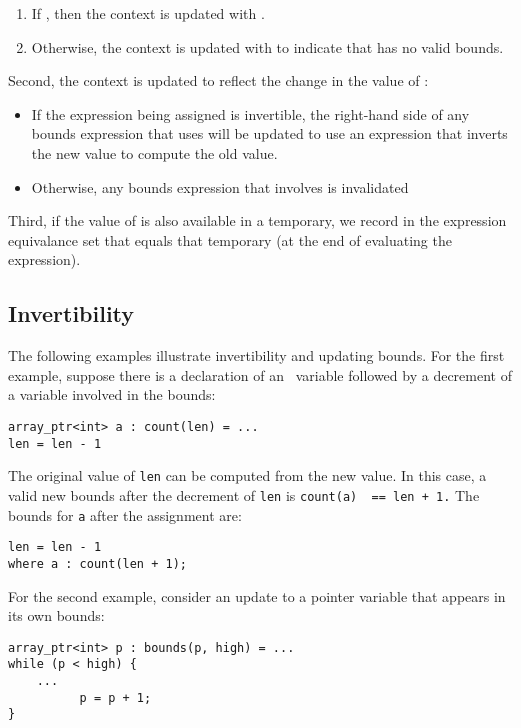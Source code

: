 \begin{enumerate}
\item
  If , then the context is updated with
  .
\item
  Otherwise, the context is updated with 
   to indicate that  has no valid bounds.
\end{enumerate}

Second, the context is updated to reflect the change in the value of
:

\begin{itemize}
\item
  If the expression being assigned is invertible, the right-hand side of
  any bounds expression that uses  will be updated to use an
  expression that inverts the new value to compute the old value.
\item
  Otherwise, any bounds expression that involves  is invalidated
\end{itemize}

Third, if the value of  is also available in a temporary,
we record in the expression equivalance set that  equals that
temporary (at the end of evaluating the expression).

\subsection{Invertibility}

The following examples illustrate invertibility and updating bounds. For
the first example, suppose there is a declaration of an
\arrayptr\ variable followed by a decrement of a variable
involved in the bounds:

\begin{lstlisting}
array_ptr<int> a : count(len) = ...
len = len - 1
\end{lstlisting}

The original value of \lstinline|len| can be computed from the new value.
In this case, a valid new bounds after the decrement of \lstinline|len| is
\lstinline|count(a)  == len + 1.| The bounds for \lstinline|a| after the
assignment are:
\begin{lstlisting}
len = len - 1
where a : count(len + 1);
\end{lstlisting}

For the second example, consider an update to a pointer variable that
appears in its own bounds:
\begin{lstlisting}
array_ptr<int> p : bounds(p, high) = ...         
while (p < high) {
    ...
          p = p + 1;
}
\end{lstlisting}

